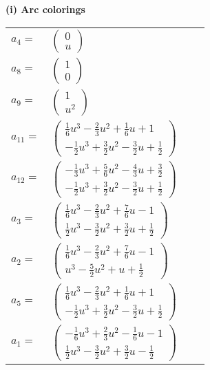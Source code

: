 \documentclass[1p]{elsarticle_modified}
\theoremstyle{definition}
\begin{document}
\flushleft \textbf{(i) Arc colorings}\\
\begin{tabular}{m{7pt} m{180pt} m{7pt} m{180pt} }
\flushright $a_{4}=$&$\begin{pmatrix}0\\u\end{pmatrix}$ \\
\flushright $a_{8}=$&$\begin{pmatrix}1\\0\end{pmatrix}$ \\
\flushright $a_{9}=$&$\begin{pmatrix}1\\u^2\end{pmatrix}$ \\
\flushright $a_{11}=$&$\begin{pmatrix}\frac{1}{6} u^3-\frac{2}{3} u^2+\frac{1}{6} u+1\\-\frac{1}{2} u^3+\frac{3}{2} u^2-\frac{3}{2} u+\frac{1}{2}\end{pmatrix}$ \\
\flushright $a_{12}=$&$\begin{pmatrix}-\frac{1}{3} u^3+\frac{5}{6} u^2-\frac{4}{3} u+\frac{3}{2}\\-\frac{1}{2} u^3+\frac{3}{2} u^2-\frac{3}{2} u+\frac{1}{2}\end{pmatrix}$ \\
\flushright $a_{3}=$&$\begin{pmatrix}\frac{1}{6} u^3-\frac{2}{3} u^2+\frac{7}{6} u-1\\\frac{1}{2} u^3-\frac{3}{2} u^2+\frac{3}{2} u+\frac{1}{2}\end{pmatrix}$ \\
\flushright $a_{2}=$&$\begin{pmatrix}\frac{1}{6} u^3-\frac{2}{3} u^2+\frac{7}{6} u-1\\u^3-\frac{5}{2} u^2+u+\frac{1}{2}\end{pmatrix}$ \\
\flushright $a_{5}=$&$\begin{pmatrix}\frac{1}{6} u^3-\frac{2}{3} u^2+\frac{1}{6} u+1\\-\frac{1}{2} u^3+\frac{3}{2} u^2-\frac{3}{2} u+\frac{1}{2}\end{pmatrix}$ \\
\flushright $a_{1}=$&$\begin{pmatrix}-\frac{1}{6} u^3+\frac{2}{3} u^2-\frac{1}{6} u-1\\\frac{1}{2} u^3-\frac{3}{2} u^2+\frac{3}{2} u-\frac{1}{2}\end{pmatrix}$ \\

\end{tabular}
\end{document}
